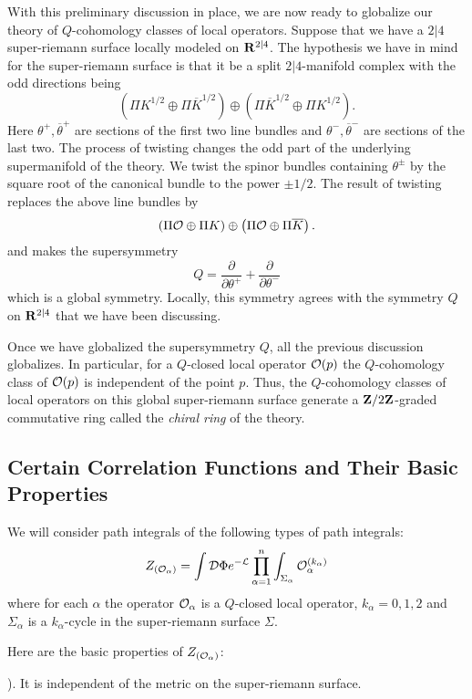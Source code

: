 With this preliminary discussion in place, we are now ready to
globalize our theory of $Q$-cohomology classes of local operators.
Suppose that we have a $2|4$ super-riemann surface locally modeled on
${\bf R}^{2|4}$.
The hypothesis we have in mind for the super-riemann surface is that
it be a split $2|4$-manifold complex with the odd directions being
$$\left(\Pi K^{1/2}\oplus \Pi \overline K^{1/2}\right)\oplus \left(\Pi
\overline K^{1/2}\oplus \Pi K^{1/2}\right).$$
Here $\theta^+,\overline\theta^+$ are sections of the first two line
bundles and $\theta^-,\overline\theta^-$ are sections of the last two.
The process of twisting changes the odd part of the  underlying
supermanifold of the theory. 
We twist the spinor bundles containing $\theta^\pm$ by the
square root of the canonical bundle to the power $\pm 1/2$.
The result of
twisting replaces the above line bundles by
$$\left({\Pi\cal O}\oplus \Pi K\right)\oplus \left(\Pi{\cal O}\oplus
\Pi\overline K\right).$$
and makes the supersymmetry
$$Q=\frac{\partial}{\partial \theta^+}+\frac{\partial}{\partial
\theta^-}$$
which is a global symmetry. Locally, this symmetry agrees with
the symmetry $Q$ on ${\bf R}^{2|4}$ that we have been discussing.

Once we have globalized the supersymmetry $Q$, all the previous
discussion globalizes. In particular, for a $Q$-closed local operator
${\cal O}(p)$ the $Q$-cohomology class of
${\cal O}(p)$ is independent of the point $p$. Thus, the $Q$-cohomology
classes of local operators on this global super-riemann surface
generate a ${\bf Z}/2{\bf Z}$-graded commutative ring    
called the {\sl chiral ring} of the theory. 



\subsection{Certain Correlation Functions and Their Basic Properties}


We will consider path integrals of the following types of path
integrals:
$$Z_{({\cal O}_\alpha)}=\int{\cal D}\Phi e^{-{\cal
L}}\prod_{\alpha=1}^n\int_{\Sigma_\alpha}{\cal O}_\alpha^{(k_\alpha)} $$
where for each $\alpha$ the operator ${\cal O}_\alpha$ is a $Q$-closed
local operator, $k_\alpha=0,1,2$ and $\Sigma_\alpha$ 
is a $k_\alpha$-cycle in the super-riemann surface $\Sigma$.

Here are the basic properties of $Z_{({\cal O}_\alpha)}$:

). It is independent of the metric on the super-riemann surface.

